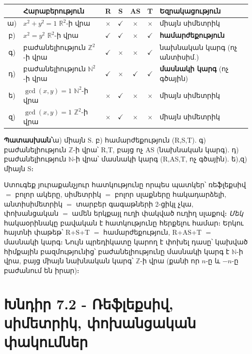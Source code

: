 \documentclass[11pt,a4paper]{article}
\newcommand{\Z}{\mathbb{Z}}
\newcommand{\R}{\mathbb{R}}
\newcommand{\N}{\mathbb{N}}
\newcommand{\answer}[1]{\begin{answerbox}\centering\textbf{Պատասխան՝}\quad #1\end{answerbox}}
\begin{document}
\begin{center}
\renewcommand{\arraystretch}{1.25}
\begin{tabular}{@{}clccccl@{}}
\toprule
 & Հարաբերություն & R & S & AS & T & Եզրակացություն\\
\midrule
ա) & $x^2+y^2=1$ $\R^2$-ի վրա & $\times$ & $\checkmark$ & $\times$ & $\times$ & միայն սիմետրիկ\\
բ) & $x^2=y^2$ $\R^2$-ի վրա & $\checkmark$ & $\checkmark$ & $\times$ & $\checkmark$ & \textbf{համարժեքություն}\\
գ) & բաժանելիություն $\Z^2$-ի վրա & $\checkmark$ & $\times$ & $\times$ & $\checkmark$ & նախնական կարգ (ոչ անտիսիմ.)\\
դ) & բաժանելիություն $\N^2$-ի վրա & $\checkmark$ & $\times$ & $\checkmark$ & $\checkmark$ & \textbf{մասնակի կարգ} (ոչ գծային)\\
ե) & $\gcd(x,y)=1$ $\N^2$-ի վրա & $\times$ & $\checkmark$ & $\times$ & $\times$ & միայն սիմետրիկ\\
զ) & $\gcd(x,y)=1$ $\Z^2$-ի վրա & $\times$ & $\checkmark$ & $\times$ & $\times$ & միայն սիմետրիկ\\
\bottomrule
\end{tabular}
\end{center}

\answer{ա) միայն S. բ) համարժեքություն (R,S,T). գ) բաժանելիություն $\Z$-ի վրա՝ R,T, բայց ոչ AS
(նախնական կարգ). դ) բաժանելիություն $\N$-ի վրա՝ մասնակի կարգ (R,AS,T, ոչ գծային). ե),զ) միայն S։}

\begin{methodbox}
Ստուգեք յուրաքանչյուր հատկությունը որպես պատկեր՝ ռեֆլեքսիվ $=$ բոլոր ակերը,
սիմետրիկ $=$ բոլոր սլաքները հակադարձելի, անտիսիմետրիկ $=$ տարբեր գագաթների 2-ցիկլ չկա, փոխանցական $=$ ամեն
երկքայլ ուղի փակված ուղիղ սլաքով։ \emph{Մեկ} հակաօրինակը բավական է հատկությունը հերքելու համար։ Երկու
հայտնի փաթեթ՝ R+S+T $=$ համարժեքություն, R+AS+T $=$ մասնակի կարգ։ Նույն պրեդիկատը կարող է փոխել դասը՝
կախված հիմքային բազմությունից՝
բաժանելիությունը մասնակի կարգ է $\N$-ի վրա, բայց միայն նախնական կարգ՝ $\Z$-ի վրա (քանի որ $n$-ը և $-n$-ը
բաժանում են իրար)։
\end{methodbox}

\section*{Խնդիր 7.2 - Ռեֆլեքսիվ, սիմետրիկ, փոխանցական փակումներ}
\end{document}

